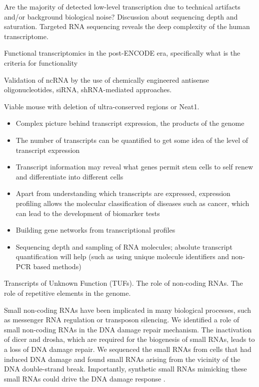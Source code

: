 Are the majority of detected low-level transcription due to technical artifacts and/or background biological noise? Discussion about sequencing depth and saturation. Targeted RNA sequencing reveals the deep complexity of the human transcriptome\cite{pmid22081020}.

Functional transcriptomics in the post-ENCODE era, specifically what is the criteria for functionality

Validation of ncRNA by the use of chemically engineered antisense oligonucleotides, siRNA, shRNA-mediated approaches.

Viable mouse with deletion of ultra-conserved regions\cite{pmid17803355} or Neat1\cite{pmid21444682}.

\begin{itemize}
   \item Complex picture behind transcript expression, the products of the genome
   \item The number of transcripts can be quantified to get some idea of the level of transcript expression
   \item Transcript information may reveal what genes permit stem cells to self renew and differentiate into different cells
   \item Apart from understanding which transcripts are expressed, expression profiling allows the molecular classification of diseases such as cancer, which can lead to the development of biomarker tests
   \item Building gene networks from transcriptional profiles
   \item Sequencing depth and sampling of RNA molecules; absolute transcript quantification will help (such as using unique molecule identifiers and non-PCR based methods)
\end{itemize}

Transcripts of Unknown Function (TUFs). The role of non-coding RNAs. The role of repetitive elements in the genome.

Small non-coding RNAs have been implicated in many biological processes, such as messenger RNA regulation or transposon silencing. We identified a role of small non-coding RNAs in the DNA damage repair mechanism. The inactivation of dicer and drosha, which are required for the biogenesis of small RNAs, leads to a loss of DNA damage repair. We sequenced the small RNAs from cells that had induced DNA damage and found small RNAs arising from the vicinity of the DNA double-strand break. Importantly, synthetic small RNAs mimicking these small RNAs could drive the DNA damage response \cite{francia2012site}.

